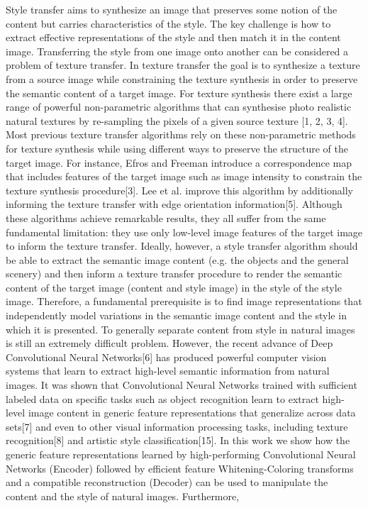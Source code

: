 \begin{intro}
	Style transfer aims to synthesize an image that
	preserves some notion of the content but carries characteristics of the style. The key challenge is how to extract effective representations of the style and then match it in the content image.
	Transferring the style from one image onto another can be considered a problem of texture transfer. In texture transfer the goal is to synthesize a texture from a source image while constraining the texture synthesis in order to preserve the semantic content of a target image. For texture synthesis there exist a large range of powerful non-parametric algorithms that can synthesise photo realistic natural textures by re-sampling the pixels of a given source texture [1, 2, 3, 4]. Most previous texture transfer algorithms rely on these non-parametric methods for texture synthesis while using different ways to preserve the structure of the target image. For instance, Efros and Freeman introduce a correspondence map that includes features of the target image such as image intensity to constrain the texture synthesis procedure[3]. Lee et al. improve this algorithm by additionally informing the texture transfer with edge orientation information[5]. Although these algorithms achieve remarkable results, they all suffer from the same fundamental limitation: they use only low-level image features of the target image to inform the texture transfer. Ideally, however, a style transfer algorithm should be able to extract the semantic image content (e.g. the objects and the general scenery) and then inform a texture transfer procedure to render the semantic content of the target image (content and style image) in the style of the style image. Therefore, a fundamental prerequisite is to find image representations that independently model variations in the semantic image content and the style in which it is presented.
	To generally separate content from style in natural images is still an extremely difficult problem.\newline
	However, the recent advance of Deep Convolutional Neural Networks[6] has produced powerful computer vision systems that learn to extract high-level semantic information from natural images.  It was shown that Convolutional Neural Networks trained with sufficient labeled data on specific tasks such as object recognition learn to extract high-level image content in generic feature representations that generalize across data sets[7] and even to other visual information processing tasks, including texture recognition[8] and artistic style classification[15].\newline
	\hspace{10mm} In this work we show how the generic feature representations learned by high-performing Convolutional Neural Networks (Encoder) followed by efficient feature Whitening-Coloring  transforms and a compatible reconstruction (Decoder) can be used to manipulate the content and the style of natural images.
	Furthermore, 
\end{intro}